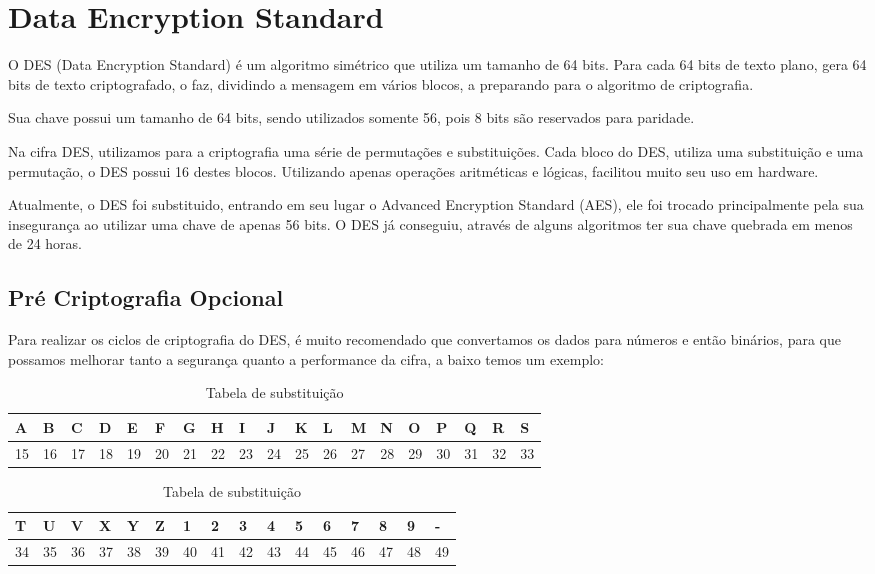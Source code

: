 \documentclass[
	article,			%
	12pt,				%
	oneside,			%
	a4paper,			%
	english,			%
	brazil,				%
	sumario=tradicional
	]{abntex2}
\begin{document}
\section{Data Encryption Standard}

O DES (Data Encryption Standard) é um algoritmo simétrico que utiliza um tamanho de 64 bits. Para cada 64 bits de texto plano, gera 64 bits de texto criptografado, o faz, dividindo a mensagem em vários blocos, a preparando para o algoritmo de criptografia.

Sua chave possui um tamanho de 64 bits, sendo utilizados somente 56, pois 8 bits são reservados para paridade.

Na cifra DES, utilizamos para a criptografia uma série de permutações e substituições. Cada bloco do DES, utiliza uma substituição e uma permutação, o DES possui 16 destes blocos. Utilizando apenas operações aritméticas e lógicas, facilitou muito seu uso em hardware.

Atualmente, o DES foi substituido, entrando em seu lugar o Advanced Encryption Standard (AES), ele foi trocado principalmente pela sua insegurança ao utilizar uma chave de apenas 56 bits. O DES já conseguiu, através de alguns algoritmos ter sua chave quebrada em menos de 24 horas.


\subsection{Pré Criptografia Opcional}

Para realizar os ciclos de criptografia do DES, é muito recomendado que convertamos os dados para números e então binários, para que possamos melhorar tanto a segurança quanto a performance da cifra, a baixo temos um exemplo:

\begin{table}[h]
\centering
\caption{Tabela de substituição}
\label{my-label}
\begin{tabular}{|l|l|l|l|l|l|l|l|l|l|l|l|l|l|l|l|l|l|l|}
\hline
A  & B  & C  & D  & E  & F  & G  & H  & I  & J  & K  & L  & M  & N  & O  & P  & Q  & R  & S  \\ \hline
15 & 16 & 17 & 18 & 19 & 20 & 21 & 22 & 23 & 24 & 25 & 26 & 27 & 28 & 29 & 30 & 31 & 32 & 33 \\ \hline
\end{tabular}

\begin{tabular}{|l|l|l|l|l|l|l|l|l|l|l|l|l|l|l|l|}
\hline
T  & U  & V  & X  & Y  & Z  & 1  & 2  & 3  & 4  & 5  & 6  & 7  & 8  & 9  & - \\ \hline
34 & 35 & 36 & 37 & 38 & 39 & 40 & 41 & 42 & 43 & 44 & 45 & 46 & 47 & 48 & 49 \\ \hline
\end{tabular}
\end{table}
\end{document}
